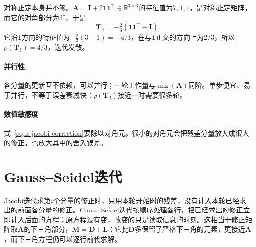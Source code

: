 对称正定本身并不够。$\bm A=\bm I+2\bm 1\bm 1^\top\in\mathbb R^{3\times3}$的特征值为$7,1,1$，是对称正定矩阵，而它的对角部分为$3\bm I$，于是
\[
 \bm T_{\mathrm J}=-\tfrac23(\bm 1\bm 1^\top-\bm I) .
\]
它沿$\bm 1$方向的特征值为$-\tfrac23(3-1)=-4/3$，在与$\bm 1$正交的方向上为$2/3$，所以$\rho(\bm T_{\mathrm J})=4/3$，迭代发散。

\paragraph{并行性}
各分量的更新互不依赖，可以并行；一轮工作量与$\operatorname{nnz}(\bm A)$同阶。单步便宜、易于并行，不等于误差衰减快：$\rho(\bm T_{\mathrm J})$接近一时需要很多轮。

\paragraph{数值敏感度}
式~\eqref{eq:ls-jacobi-correction}要除以对角元。很小的对角元会把残差分量放大成很大的修正，也放大其中的舍入误差。

\section{Gauss--Seidel迭代}
\label{sec:ls-gauss-seidel}

Jacobi迭代求第$i$个分量的修正时，只用本轮开始时的残差，没有计入本轮已经求出的前面各分量的修正。Gauss--Seidel迭代按顺序处理各行，把已经求出的修正立即计入后面的方程；原方程没有变，改变的只是读取信息的时刻。这相当于修正矩阵取$\bm A$的下三角部分，$\bm M=\bm D+\bm L$：它比$\bm D$多保留了严格下三角的元素，更接近$\bm A$，而下三角方程仍可以逐行前代求解。

